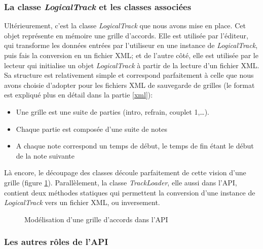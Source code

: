 \subsubsection*{La classe \textit{LogicalTrack} et les classes associées}

Ultérieurement, c'est la classe \textit{LogicalTrack} que nous avons mise en place. Cet objet représente en mémoire une grille d'accords. Elle est utilisée par l'éditeur, qui transforme les données entrées par l'utiliseur en une instance de \textit{LogicalTrack}, puis fais la conversion en un fichier XML; et de l'autre côté, elle est utilisée par le lecteur qui initialise un objet \textit{LogicalTrack} à partir de la lecture d'un fichier XML. Sa structure est relativement simple et correspond parfaitement à celle que nous avons choisie d'adopter pour les fichiers XML de sauvegarde de grilles (le format est expliqué plus en détail dans la partie \ref{xml}):
\begin{itemize}
 \item Une grille est une suite de parties (intro, refrain, couplet 1,\dots).
 \item Chaque partie est composée d'une suite de notes
 \item A chaque note correspond un temps de début, le temps de fin étant le début de la note suivante
\end{itemize}

Là encore, le découpage des classes découle parfaitement de cette vision d'une grille (figure \ref{diag_api_tracks}). Parallèlement, la classe \textit{TrackLoader}, elle aussi dans l'\ac{API}, contient deux méthodes statiques qui permettent la conversion d'une instance de \textit{LogicalTrack} vers un fichier XML, ou inversement.

\begin{figure}[H]
\begin{center}
\caption{Modélisation d'une grille d'accords dans l'\ac{API}}
\label{diag_api_tracks}
\end{center}
\end{figure}

\subsubsection*{Les autres rôles de l'\ac{API}}

